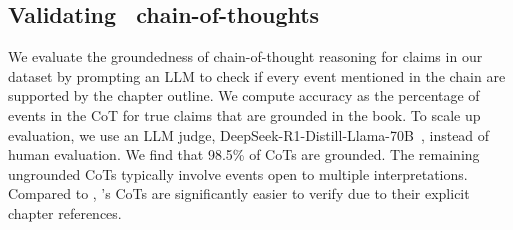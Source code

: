 \subsection{Validating \pipeline\ chain-of-thoughts}
\label{data:cot_validation}
We evaluate the groundedness of chain-of-thought reasoning for claims in our dataset by prompting an LLM to check if every event mentioned in the chain are supported by the chapter outline. We compute accuracy as the percentage of events in the CoT for true
claims that are grounded in the book. To scale up evaluation, we use an LLM judge, DeepSeek-R1-Distill-Llama-70B~\cite{deepseekai2025deepseekr1incentivizingreasoningcapability}, instead of human evaluation. 
We find that 98.5\% of CoTs are grounded. The remaining ungrounded CoTs typically involve events open to multiple interpretations. Compared to \naive, \pipeline's CoTs are significantly easier to verify due to their explicit chapter references.
